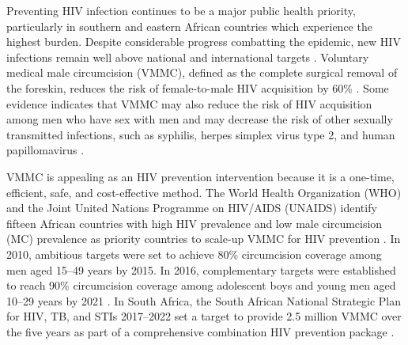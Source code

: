 \documentclass{article}
\begin{document}
Preventing HIV infection continues to be a major public health priority, particularly in southern and eastern African countries which experience the highest burden. Despite considerable progress combatting the epidemic, new HIV infections remain well above national and international targets \autocite{UNAIDSHighLevel}. Voluntary medical male circumcision (VMMC), defined as the complete surgical removal of the foreskin, reduces the risk of female-to-male HIV acquisition by 60\% \autocite{gray2007male, bailey2007male, auvert2005randomized, gray2012effectiveness, grund2017association}. Some evidence indicates that VMMC may also reduce the risk of HIV acquisition among men who have sex with men \autocite{pintye2019benefits} and may decrease the risk of other sexually transmitted infections, such as syphilis, herpes simplex virus type 2, and human papillomavirus \autocite{tobian2009male}.

VMMC is appealing as an HIV prevention intervention because it is a one-time, efficient, safe, and cost-effective method. The World Health Organization (WHO) and the Joint United Nations Programme on HIV/AIDS (UNAIDS) identify fifteen African countries with high HIV prevalence and low male circumcision (MC) prevalence as priority countries to scale-up VMMC for HIV prevention \autocite{UNAIDSJoint, davis2018progress, WHOVoluntary2}. In 2010, ambitious targets were set to achieve 80\% circumcision coverage among men aged 15--49 years by 2015. In 2016, complementary targets were established to reach 90\% circumcision coverage among adolescent boys and young men aged 10--29 years by 2021  \autocite{WHOFramework}. In South Africa, the South African National Strategic Plan for HIV, TB, and STIs 2017--2022 set a target to provide 2.5 million VMMC over the five years as part of a comprehensive combination HIV prevention package \autocite{sanac}.
\end{document}
